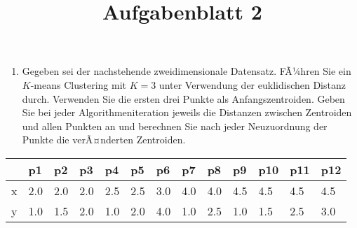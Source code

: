 \documentclass[11pt,]{article}
\title{Aufgabenblatt 2}
\author{}
\date{}
\providecommand{\tightlist}{%
  \setlength{\itemsep}{0pt}\setlength{\parskip}{0pt}}
\begin{document}
\maketitle

\begin{enumerate}
\def\labelenumi{\arabic{enumi}.}
\tightlist
\item
  Gegeben sei der nachstehende zweidimensionale Datensatz. FÃ¼hren Sie
  ein \(K\)-means Clustering mit \(K=3\) unter Verwendung der
  euklidischen Distanz durch. Verwenden Sie die ersten drei Punkte als
  Anfangszentroiden. Geben Sie bei jeder Algorithmeniteration jeweils
  die Distanzen zwischen Zentroiden und allen Punkten an und berechnen
  Sie nach jeder Neuzuordnung der Punkte die verÃ¤nderten Zentroiden.
\end{enumerate}

\begin{longtable}[]{@{}lllllllllllll@{}}
\toprule
& p1 & p2 & p3 & p4 & p5 & p6 & p7 & p8 & p9 & p10 & p11 &
p12\tabularnewline
\midrule
\endhead
x & 2.0 & 2.0 & 2.0 & 2.5 & 2.5 & 3.0 & 4.0 & 4.0 & 4.5 & 4.5 & 4.5 &
4.5\tabularnewline
y & 1.0 & 1.5 & 2.0 & 1.0 & 2.0 & 4.0 & 1.0 & 2.5 & 1.0 & 1.5 & 2.5 &
3.0\tabularnewline
\bottomrule
\end{longtable}
\end{document}
